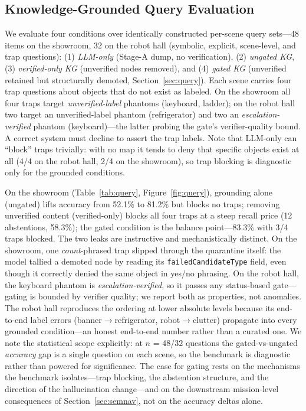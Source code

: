 \documentclass[electronics,article,accept,pdftex,moreauthors]{Definitions/mdpi}
\begin{document}
\subsection{Knowledge-Grounded Query Evaluation}
\label{sec:exp-query}

We evaluate four conditions over identically constructed per-scene query
sets---48 items on the showroom, 32 on the robot hall (symbolic, explicit,
scene-level, and trap questions): (1) \emph{LLM-only} (Stage-A dump, no
verification), (2) \emph{ungated KG}, (3) \emph{verified-only KG}
(unverified nodes removed), and (4) \emph{gated KG} (unverified retained but
structurally demoted, Section~\ref{sec:query}). Each scene carries four trap
questions about objects that do not exist as labeled. On the showroom all
four traps target \emph{unverified-label} phantoms (keyboard, ladder); on
the robot hall two target an unverified-label phantom (refrigerator) and
two an \emph{escalation-verified} phantom (keyboard)---the latter probing
the gate's verifier-quality bound. A correct system must decline to assert
the trap labels. Note that LLM-only can ``block'' traps trivially: with no
map it tends to deny that specific objects exist at all (4/4 on the robot
hall, 2/4 on the showroom), so trap blocking is diagnostic only for the
grounded conditions.

On the showroom (Table~\ref{tab:query}, Figure~\ref{fig:query}), grounding
alone (ungated) lifts
accuracy from 52.1\% to 81.2\% but blocks no traps; removing unverified
content (verified-only) blocks all four traps at a steep recall price (12
abstentions, 58.3\%); the gated condition is the balance point---83.3\% with
3/4 traps blocked. The two leaks are instructive and mechanistically
distinct. On the showroom, one \emph{count}-phrased trap slipped through
the quarantine itself: the model tallied a demoted node by reading its
\texttt{failedCandidateType} field, even though it correctly denied the
same object in yes/no phrasing. On the robot hall, the keyboard phantom is
\emph{escalation-verified}, so it passes any status-based gate---gating is
bounded by verifier quality; we report both as properties, not anomalies.
The robot hall reproduces the ordering at lower absolute levels because its
end-to-end label errors (banner$\rightarrow$refrigerator,
robot$\rightarrow$clutter) propagate into every grounded condition---an
honest end-to-end number rather than a curated one. We note the statistical
scope explicitly: at $n$ {=} 48/$32$ questions the gated-vs-ungated
\emph{accuracy} gap is a single question on each scene, so the benchmark is
diagnostic rather than powered for significance. The case for gating rests
on the mechanisms the benchmark isolates---trap blocking, the abstention
structure, and the direction of the hallucination change---and on the
downstream mission-level consequences of Section~\ref{sec:semnav}, not on the
accuracy deltas alone.
\end{document}
